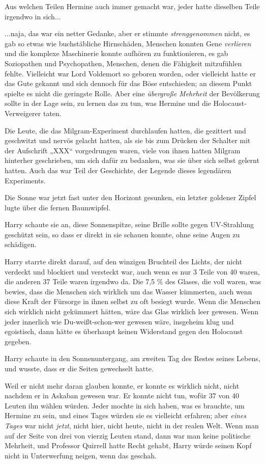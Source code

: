 {Aus welchen Teilen Hermine auch immer gemacht war, jeder hatte dieselben Teile irgendwo in sich...

...naja, das war ein netter Gedanke, aber er stimmte \emph{strenggenommen} nicht, es gab so etwas wie buchstäbliche Hirnschäden, Menschen konnten Gene \emph{verlieren} und die komplexe Maschinerie konnte aufhören zu funktionieren, es gab Soziopathen und Psychopathen, Menschen, denen die Fähigkeit mitzufühlen fehlte. Vielleicht war Lord Voldemort so geboren worden, oder vielleicht hatte er das Gute gekannt und sich dennoch für das Böse entschieden; an diesem Punkt spielte es nicht die geringste Rolle. Aber eine \emph{übergroße Mehrheit} der Bevölkerung sollte in der Lage sein, zu lernen das zu tun, was Hermine und die Holocaust-Verweigerer taten.

Die Leute, die das Milgram-Experiment durchlaufen hatten, die gezittert und geschwitzt und nervös gelacht hatten, als sie bis zum Drücken der Schalter mit der Aufschrift „XXX“ vorgedrungen waren, viele von ihnen hatten Milgram hinterher geschrieben, um sich dafür zu bedanken, was sie über sich selbst gelernt hatten. Auch das war Teil der Geschichte, der Legende dieses legendären Experiments.

Die Sonne war jetzt fast unter den Horizont gesunken, ein letzter goldener Zipfel lugte über die fernen Baumwipfel.

Harry schaute sie an, diese Sonnenspitze, seine Brille sollte gegen UV-Strahlung geschützt sein, so dass er direkt in sie schauen konnte, ohne seine Augen zu schädigen.

Harry starrte direkt darauf, auf den winzigen Bruchteil des Lichts, der nicht verdeckt und blockiert und versteckt war, auch wenn es nur 3 Teile von 40 waren, die anderen 37 Teile waren irgendwo da. Die 7,5 \% des Glases, die voll waren, was bewies, dass die Menschen sich wirklich um das Wasser kümmerten, auch wenn diese Kraft der Fürsorge in ihnen selbst zu oft besiegt wurde. Wenn die Menschen sich wirklich nicht gekümmert hätten, wäre das Glas wirklich leer gewesen. Wenn jeder innerlich wie Du-weißt-schon-wer gewesen wäre, insgeheim klug und egoistisch, dann hätte es überhaupt keinen Widerstand gegen den Holocaust gegeben.

Harry schaute in den Sonnenuntergang, am zweiten Tag des Restes seines Lebens, und wusste, dass er die Seiten gewechselt hatte.

Weil er nicht mehr daran glauben konnte, er konnte es wirklich nicht, nicht nachdem er in Askaban gewesen war. Er konnte nicht tun, wofür 37 von 40 Leuten ihn wählen würden. Jeder mochte in sich haben, was es brauchte, um Hermine zu sein, und eines Tages würden sie es vielleicht erfahren; aber \emph{eines Tages} war nicht \emph{jetzt}, nicht hier, nicht heute, nicht in der realen Welt. Wenn man auf der Seite von drei von vierzig Leuten stand, dann war man keine politische Mehrheit, und Professor Quirrell hatte Recht gehabt, Harry würde seinen Kopf nicht in Unterwerfung neigen, wenn das geschah.

}
